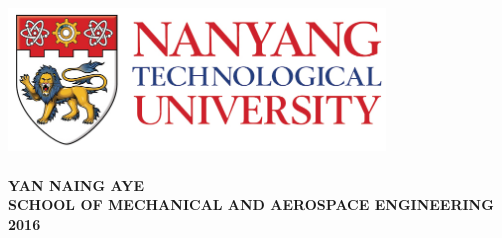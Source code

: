 \begin{titlepage}

\begin{center}

\includegraphics[width=10cm]{./Fig/ntu_logo.jpg}\\[3cm]  
  
{\Large  \bfseries \titleSentence}\\[1cm]
\vfill
{\Large \bfseries YAN NAING AYE}\\[1cm]
{\Large \bfseries SCHOOL OF MECHANICAL AND AEROSPACE ENGINEERING}\\[1cm]
{\Large \bfseries  2016}

\end{center}
\end{titlepage}